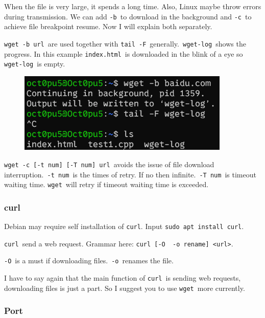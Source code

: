 \documentclass[12pt]{ctexart}
\newenvironment{mdquote}
{%
  \par\noindent
  \begin{list}{}{%
      \setlength{\leftmargin}{1em}%
      \setlength{\rightmargin}{0pt}%
      \setlength{\itemindent}{0pt}%
      \setlength{\listparindent}{\parindent}%
      \setlength{\topsep}{0.5\baselineskip}%
  }
  \item[\textbf{>}\ ]\itshape
}
{\end{list}\par}
\begin{document}
When the file is very large, it spends a long time. Also, Linux maybe
throw errors during transmission. We can add \texttt{-b}\ to download in
the background and \texttt{-c}\ to achieve file breakpoint resume. Now I
will explain both separately.

\texttt{wget\ -b\ url}\ are used together with \texttt{tail\ -F}\
generally.\ \texttt{wget-log}\ shows the progress. In this example
\texttt{index.html}\ is downloaded in the blink of a eye so
\texttt{wget-log}\ is empty.

\begin{figure}[H]
    \centering
    \includegraphics[width=0.9\textwidth,keepaspectratio]{assets/Linux/1.9 Linux network commands/4.png}
\end{figure}

\texttt{wget\ -c\ {[}-t\ num{]}\ {[}-T\ num{]}\ url}\ avoids the issue of
file download interruption.\ \texttt{-t\ num}\ is the times of retry. If
no then infinite.\ \texttt{-T\ num}\ is timeout waiting time.
\texttt{wget}\ will retry if timeout waiting time is exceeded.

\subsubsection{\textbf{curl}}

\begin{mdquote}
Debian may require self installation of \texttt{curl}. Input
\texttt{sudo\ apt\ install\ curl}.
\end{mdquote}

\texttt{curl}\ send a web request. Grammar here:
\texttt{curl\ {[}-O\ \textbar{}\ -o\ rename{]}\ \textless{}url\textgreater{}}.

\texttt{-O}\ is a must if downloading files.\ \texttt{-o}\ renames the
file.

I have to say again that the main function of \texttt{curl}\ is sending
web requests, downloading files is just a part. So I suggest you to use
\texttt{wget}\ more currently.

\subsubsection{\textbf{Port}}
\end{document}
